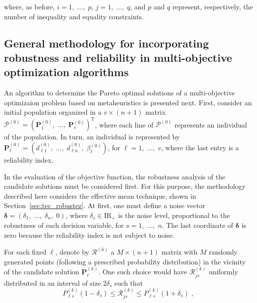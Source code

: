 \documentclass[final,5p,times,twocolumn,numbers]{elsarticle}
\newcommand{\vect}[1]{\mathbf{\boldsymbol{#1}}}
\begin{document}
\noindent where, as before, $ i = 1, \; \dots, \; p $, $ j = 1, \; \dots, \; q $, and $ p $ and $ q $ represent, respectively, the number of inequality and equality constraints.

\subsection{General methodology for incorporating robustness and reliability in multi-objective optimization algorithms}

An algorithm to determine the Pareto optimal solutions of a multi-objective optimizaion problem based on metaheuristics is presented next. First, consider an initial population organized in a $ v \times \left( n + 1 \right) $ matrix $ \boldsymbol{\mathcal{P}}^{\left( 0 \right)} = \left( \mathbf{P}_{1}^{\left( 0 \right)}, \; \dots, \; \mathbf{P}_{v}^{\left( 0 \right)} \right)^{\mathrm{T}} $, where each line of $ \boldsymbol{\mathcal{P}}^{\left( 0 \right)} $ represents an individual of the population. In turn, an individual is represented by $ \mathbf{P}_{\ell}^{\left( 0 \right)} = \left( d_{\ell 1}^{\left( 0 \right)}, \; \dots, \; d_{\ell n}^{\left( 0 \right)}, \; \beta_{\ell}^{\left( 0 \right)} \right) $, for $ \ell = 1, \; \dots, \; v $, where the last entry is a reliability index.

In the evaluation of the objective function, the robustness analysis of the candidate solutions must be considered first. For this purpose, the methodology described here considers the effective mean technique, shown in Section~\ref{sec:tec_robustez}. At first, one must define a noise vector $ \vect{\delta} = \left( \delta_{1}, \; \dots, \; \delta_{n}, \; 0 \right) $, where $ \delta_{s} \in \mathrm{I\!R}_{+} $ is the noise level, proportional to the robustness of each decision variable, for $ s = 1, \; \dots, \; n $. The last coordinate of $ \vect{\delta} $ is zero because the reliability index is not subject to noise.

For each fixed $ \ell $, denote by $ \vect{\mathcal{R}}^{\left( k \right)} $ a $ M \times \left( n + 1 \right) $ matrix with $ M $ randomly generated points (following a prescribed probability distribution) in the vicinity of the candidate solution $ \mathbf{P}_{\ell}^{\left( k \right)} $. One such choice would have $ \mathcal{R}_{js}^{\left( k \right)} $ uniformly distributed in an interval of size $ 2 \delta_{s} $ such that
%
\begin{equation*}
P_{{\ell}s}^{\left( k \right)} \left( 1 - \delta_{s} \right) \leq \mathcal{R}_{js}^{\left( k \right)} \leq P_{{\ell}s}^{\left( k \right)} \left( 1 + \delta_{s} \right) \; ,
\end{equation*}
\end{document}
